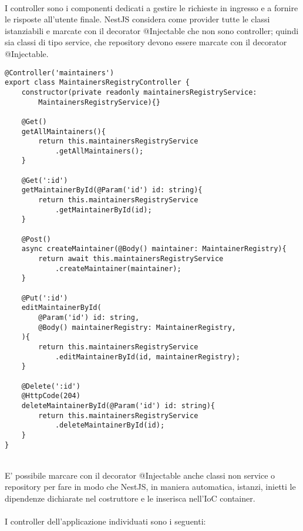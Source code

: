 \leavevmode\newline
\\
I controller sono i componenti dedicati a gestire le richieste in ingresso e a fornire le risposte all'utente
finale. NestJS considera come provider tutte le classi istanziabili e marcate con il decorator 
@Injectable che non sono controller; quindi sia classi di tipo service, che repository devono essere marcate
con il decorator @Injectable. 
\\
\begin{lstlisting}
@Controller('maintainers')
export class MaintainersRegistryController {
    constructor(private readonly maintainersRegistryService: 
        MaintainersRegistryService){}

    @Get()
    getAllMaintainers(){
        return this.maintainersRegistryService
            .getAllMaintainers();
    }

    @Get(':id')
    getMaintainerById(@Param('id') id: string){
        return this.maintainersRegistryService
            .getMaintainerById(id);
    }

    @Post()
    async createMaintainer(@Body() maintainer: MaintainerRegistry){
        return await this.maintainersRegistryService
            .createMaintainer(maintainer);
    }

    @Put(':id')
    editMaintainerById(
        @Param('id') id: string,
        @Body() maintainerRegistry: MaintainerRegistry,
    ){
        return this.maintainersRegistryService
            .editMaintainerById(id, maintainerRegistry);
    }

    @Delete(':id')
    @HttpCode(204)
    deleteMaintainerById(@Param('id') id: string){
        return this.maintainersRegistryService
            .deleteMaintainerById(id);
    }
}
\end{lstlisting}
\leavevmode\newline
\\
E' possibile marcare con il decorator @Injectable
anche classi non service o repository per fare in modo che NestJS, in maniera automatica, istanzi, inietti le dipendenze 
dichiarate nel costruttore e le inserisca nell'IoC container.
\\\\
I controller dell'applicazione individuati sono i seguenti:
